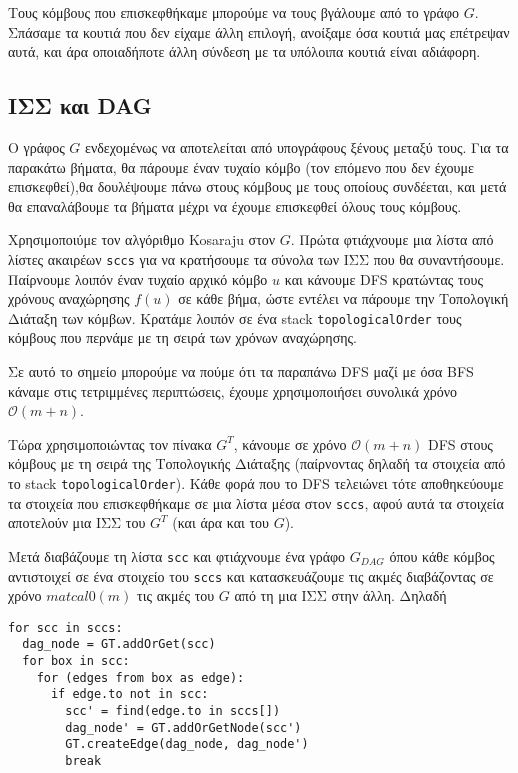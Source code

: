 \documentclass[a4paper,11pt]{article}
\begin{document}
Τους κόμβους που επισκεφθήκαμε μπορούμε να τους βγάλουμε από το γράφο $G$. Σπάσαμε τα κουτιά που δεν είχαμε άλλη επιλογή, ανοίξαμε όσα κουτιά μας επέτρεψαν αυτά, και άρα οποιαδήποτε άλλη σύνδεση με τα υπόλοιπα κουτιά είναι αδιάφορη.

\subsection*{ΙΣΣ και DAG}
Ο γράφος $G$ ενδεχομένως να αποτελείται από υπογράφους ξένους μεταξύ τους. Για τα παρακάτω βήματα, θα πάρουμε έναν τυχαίο κόμβο (τον επόμενο που δεν έχουμε επισκεφθεί),θα δουλέψουμε πάνω στους κόμβους με τους οποίους συνδέεται, και μετά θα επαναλάβουμε τα βήματα μέχρι να έχουμε επισκεφθεί όλους τους κόμβους.

Χρησιμοποιύμε τον αλγόριθμο Kosaraju στον $G$. Πρώτα φτιάχνουμε μια λίστα από λίστες ακαιρέων \verb|sccs| για να κρατήσουμε τα σύνολα των ΙΣΣ που θα συναντήσουμε. Παίρνουμε λοιπόν έναν τυχαίο αρχικό κόμβο $u$ και κάνουμε DFS κρατώντας τους χρόνους αναχώρησης $f(u)$ σε κάθε βήμα, ώστε εντέλει να πάρουμε την Τοπολογική Διάταξη των κόμβων. Κρατάμε λοιπόν σε ένα stack \verb|topologicalOrder| τους κόμβους που περνάμε με τη σειρά των χρόνων αναχώρησης.

Σε αυτό το σημείο μπορούμε να πούμε ότι τα παραπάνω DFS μαζί με όσα ΒFS κάναμε στις τετριμμένες περιπτώσεις, έχουμε χρησιμοποιήσει συνολικά χρόνο $\mathcal{O}(m+n)$.

Τώρα χρησιμοποιώντας τον πίνακα $G^T$, κάνουμε σε χρόνο $\mathcal{O}(m+n)$ DFS στους κόμβους με τη σειρά της Τοπολογικής Διάταξης (παίρνοντας δηλαδή τα στοιχεία από το stack \verb|topologicalOrder|). Κάθε φορά που το DFS τελειώνει τότε αποθηκεύουμε τα στοιχεία που επισκεφθήκαμε σε μια λίστα μέσα στον \verb|sccs|, αφού αυτά τα στοιχεία αποτελούν μια ΙΣΣ του $G^T$ (και άρα και του $G$).

Μετά διαβάζουμε τη λίστα \verb|scc| και φτιάχνουμε ένα γράφο $G_{DAG}$ όπου κάθε κόμβος αντιστοιχεί σε ένα στοιχείο του \verb|sccs| και κατασκευάζουμε τις ακμές διαβάζοντας σε χρόνο $matcal{0}(m)$ τις ακμές του $G$ από τη μια ΙΣΣ στην άλλη. Δηλαδή
\begin{verbatim}
for scc in sccs:
  dag_node = GT.addOrGet(scc)
  for box in scc:
    for (edges from box as edge):
      if edge.to not in scc:
        scc' = find(edge.to in sccs[])
        dag_node' = GT.addOrGetNode(scc')
        GT.createEdge(dag_node, dag_node')
        break      
\end{verbatim}
\end{document}

